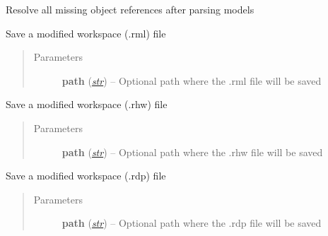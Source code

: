 \documentclass[letterpaper,10pt,english]{sphinxmanual}
\begin{document}
\begin{fulllineitems}
\begin{fulllineitems}
\end{fulllineitems}


\begin{fulllineitems}
\label{class_Project:ROSMOD_Project.resolve_references}
Resolve all missing object references after parsing models

\end{fulllineitems}


\begin{fulllineitems}
\label{class_Project:ROSMOD_Project.save_rml}
Save a modified workspace (.rml) file
\begin{quote}\begin{description}
\item[{Parameters}] \leavevmode
\textbf{path} (\href{http://docs.python.org/library/functions.html\#str}{\emph{str}}) -- Optional path where the .rml file will be saved

\end{description}\end{quote}

\end{fulllineitems}


\begin{fulllineitems}
\label{class_Project:ROSMOD_Project.save_rhw}
Save a modified workspace (.rhw) file
\begin{quote}\begin{description}
\item[{Parameters}] \leavevmode
\textbf{path} (\href{http://docs.python.org/library/functions.html\#str}{\emph{str}}) -- Optional path where the .rhw file will be saved

\end{description}\end{quote}

\end{fulllineitems}


\begin{fulllineitems}
\label{class_Project:ROSMOD_Project.save_rdp}
Save a modified workspace (.rdp) file
\begin{quote}\begin{description}
\item[{Parameters}] \leavevmode
\textbf{path} (\href{http://docs.python.org/library/functions.html\#str}{\emph{str}}) -- Optional path where the .rdp file will be saved


\end{description}
\end{quote}
\end{fulllineitems}
\end{fulllineitems}
\end{document}
